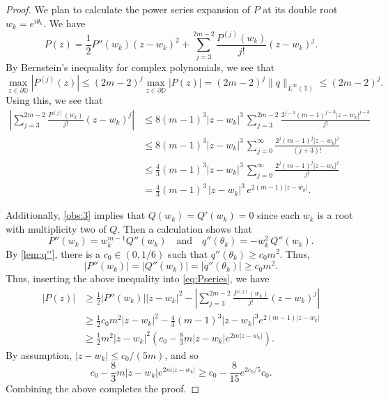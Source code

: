 \documentclass[11pt]{article}
\theoremstyle{definition}
\numberwithin{theorem}{section}
\numberwithin{equation}{section}
\def\D{\mathbb{D}}
\def\T{\mathbb{T}}
\def\andspace{\quad\text{and}\quad}
\numberwithin{equation}{section}
\begin{document}
\begin{proof}
    We plan to calculate the power series expansion of $P$ at its double root $w_k=e^{i\theta_k}$. 
    We have
	\begin{equation}
		\label{eq:Pseries}
		P(z)=\frac 12 P''(w_k)(z-w_k)^2 + \sum_{j=3}^{2m-2} \frac{P^{(j)}(w_k)}{j!} (z-w_k)^j. 
	\end{equation}
	By Bernstein's inequality for complex polynomials, we see that 
	$$
	\max_{z\in \partial\D} |P^{(j)}(z)|
	\leq (2m-2)^j \max_{z\in \partial\D} |P(z)|
	= (2m-2)^j \|q\|_{L^\infty(\T)}
	\leq (2m-2)^j. 
	$$ 
	Using this, we see that
	\begin{align*}
		\left| \sum_{j=3}^{2m-2} \frac{P^{(j)}(w_k)}{j!}(z-w_k)^j \right|
		&\leq 8(m-1)^3|z-w_k|^3 \, \sum_{j=3}^{2m-2} \frac{2^{j-3}(m-1)^{j-3} |z-w_k|^{j-3}}{j!} \\
		&\leq 8(m-1)^3|z-w_k|^3 \, \sum_{j=0}^\infty \frac{2^j(m-1)^j |z-w_k|^j}{(j+3)!} \\
        &\leq \frac{4}{3} (m-1)^3|z-w_k|^3 \, \sum_{j=0}^\infty \frac{2^j(m-1)^j |z-w_k|^j}{j!} \\
		&= \frac{4}{3} (m-1)^3 \, |z-w_k|^3 \, e^{2 (m-1)|z-w_k|}. 
	\end{align*}
    
    
    Additionally, \cref{obs:3} implies that $Q(w_k)=Q'(w_k)=0$ since each $w_k$ is a root with multiplicity two of $Q$. Then a calculation shows that 
    $$
    P''(w_k)=w_k^{m-1}Q''(w_k) \andspace q''(\theta_k)=-w_k^2 \, Q''(w_k).
    $$
    By \cref{lem:q''}, there is a $c_0\in (0,1/6)$ such that $q''(\theta_k)\geq c_0m^2$. Thus,
	$$
	|P''(w_k)|
	=|Q''(w_k)|
	=|q''(\theta_k)|
	\geq c_0 m^2.
	$$
	Thus, inserting the above inequality into \eqref{eq:Pseries}, we have
	\begin{align*}
		|P(z)|
		&\geq \frac 12 |P''(w_k)||z-w_k|^2 - \left| \sum_{j=3}^{2m-2} \frac{P^{(j)}(w_k)}{j!}(z-w_k)^j \right| \\
		&\geq \frac 12 c_0 m^2 |z-w_k|^2- \frac 4 3(m-1)^3|z-w_k|^3 e^{2(m-1)|z-w_k|} \\
		&\geq \frac 12 m^2 |z-w_k|^2 \left( c_0 - \frac 83 m|z-w_k| e^{2 m|z-w_k|}\right).
	\end{align*}
    By assumption, $|z-w_k|\leq c_0/(5m)$, and so 
    $$
    c_0-\frac 8 3m|z-w_k| e^{2 m|z-w_k|}
    \geq c_0-\frac{8}{15} e^{2c_0/5} c_0.
    $$
    Combining the above completes the proof. 
\end{proof}
\end{document}
